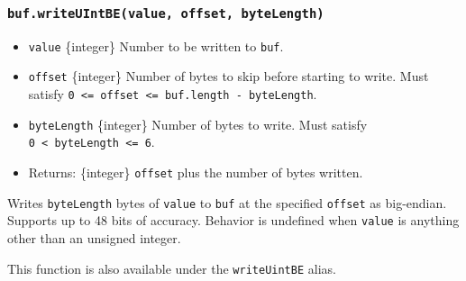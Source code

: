\begin{Shaded}
\begin{Highlighting}[]
\NormalTok{ \{ }\NormalTok{ \} }\OperatorTok{=} \NormalTok{(}\NormalTok{)}\OperatorTok{;}

\OperatorTok{=} \NormalTok{(}\NormalTok{)}\OperatorTok{;}

\NormalTok{(}\OperatorTok{,} \NormalTok{)}\OperatorTok{;}

\OperatorTok{;}
\end{Highlighting}
\end{Shaded}

\subsubsection{\texorpdfstring{\texttt{buf.writeUIntBE(value,\ offset,\ byteLength)}}{buf.writeUIntBE(value, offset, byteLength)}}\label{buf.writeuintbevalue-offset-bytelength}

\begin{itemize}
\tightlist
\item
  \texttt{value} \{integer\} Number to be written to \texttt{buf}.
\item
  \texttt{offset} \{integer\} Number of bytes to skip before starting to
  write. Must satisfy
  \texttt{0\ \textless{}=\ offset\ \textless{}=\ buf.length\ -\ byteLength}.
\item
  \texttt{byteLength} \{integer\} Number of bytes to write. Must satisfy
  \texttt{0\ \textless{}\ byteLength\ \textless{}=\ 6}.
\item
  Returns: \{integer\} \texttt{offset} plus the number of bytes written.
\end{itemize}

Writes \texttt{byteLength} bytes of \texttt{value} to \texttt{buf} at
the specified \texttt{offset} as big-endian. Supports up to 48 bits of
accuracy. Behavior is undefined when \texttt{value} is anything other
than an unsigned integer.

This function is also available under the \texttt{writeUintBE} alias.

